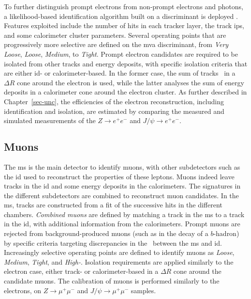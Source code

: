 To further distinguish prompt electrons from non-prompt electrons and photons, a likelihood-based identification algorithm built on a  discriminant is deployed \cite{Aaboud:2657964}. Features exploited include the number of hits in each tracker layer, the track \glspl{ip}, and some calorimeter cluster parameters. Several operating points that are progressively more selective are defined on the \gls{mva} discriminant, from \textit{Very Loose}, \textit{Loose}, \textit{Medium}, to \textit{Tight}. Prompt electron candidates are required to be isolated from other tracks and energy deposits, with specific isolation criteria that are either \gls{id}- or calorimeter-based. In the former case, the sum of tracks \pt\ in a $\Delta R$ cone around the electron is used, while the latter analyses the sum of energy deposits in a calorimeter cone around the electron cluster. As further described in Chapter~\ref{sec-unc}, the efficiencies of the electron reconstruction, including identification and isolation, are estimated by comparing the measured and simulated measurements of the $Z\rightarrow e^+e^-$ and $J/\psi\rightarrow e^+e^-$. 

\subsection{Muons}\label{sec-atlas-mu}
The \gls{ms} is the main detector to identify muons, with other subdetectors such as the \gls{id} used to reconstruct the properties of these leptons. Muons indeed leave tracks in the \gls{id} and some energy deposits in the calorimeters. The signatures in the different subdetectors are combined to reconstruct muon candidates. In the \gls{ms}, tracks are constructed from a fit of the successive hits in the different chambers. \textit{Combined muons} are defined by matching a track in the \gls{ms} to a track in the \gls{id}, with additional information from the calorimeters. Prompt muons are rejected from background-produced muons (such as in the decay of a $b$-hadron) by specific criteria targeting discrepancies in the \pt\ between the \gls{ms} and \gls{id}. Increasingly selective operating points are defined to identify muons as \textit{Loose}, \textit{Medium}, \textit{Tight}, and \textit{High-\pt}. Isolation requirements are applied similarly to the electron case, either track- or calorimeter-based in a $\Delta R$ cone around the candidate muons. The calibration of muons is performed similarly to the electrons, on $Z\rightarrow \mu^+\mu^-$ and $J/\psi\rightarrow \mu^+\mu^-$ samples.


